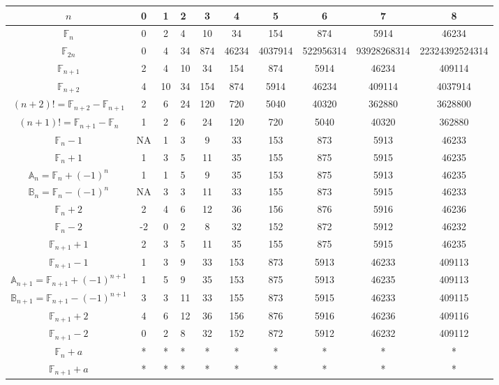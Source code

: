 \documentclass[pdflatex,sn-mathphys-num]{sn-jnl}%
\theoremstyle{thmstyleone}%
\theoremstyle{thmstyletwo}%
\theoremstyle{thmstylethree}%
\begin{document}
\begin{table}[!ht]\label{T}
    \centering
    \begin{tabular}{|c|c|c|a|c|c|c|c|c|c|}\hline 
        $n$& 0 & 1 & 2 & 3 &4  &5  & 6 & 7 &8 \\\hline 
         $\mathbb{F}_n$& 0 & 2 & 4 & 10 & 34 &154  & 874 & 5914 & 46234 \\\hline
          $\mathbb{F}_{2n}$& 0 & 4 & 34 & 874 & 46234 &4037914  & 522956314 & 93928268314 & 22324392524314 \\\hline   
        $\mathbb{F}_{n+1}$ & 2 & 4 & 10 & 34 & 154 & 874 & 5914 & 46234 &409114 \\\hline
         $\mathbb{F}_{n+2}$ & 4 & 10 & 34 & 154 & 874 & 5914 & 46234 & 409114 &4037914 \\\hline
          $(n+2)!=\mathbb{F}_{n+2}-\mathbb{F}_{n+1}$ & 2 & 6 & 24 & 120 & 720 & 5040 & 40320 & 362880 &3628800 \\\hline
           $(n+1)!=\mathbb{F}_{n+1}-\mathbb{F}_{n}$ & 1 & 2 & 6 & 24 & 120 & 720 & 5040 & 40320 &362880 \\\hline
         $\mathbb{F}_{n}-1$ & NA & 1 & 3 & 9 & 33 & 153 & 873 & 5913 &46233 \\\hline
         $\mathbb{F}_{n}+1$ &1  & 3 & 5 & 11 & 35 & 155 & 875 & 5915 &46235 \\\hline
         $\mathbb{A}_n=\mathbb{F}_{n}+(-1)^n$ & 1 & 1 & 5 & 9 & 35 & 153 & 875 & 5913 & 46235\\\hline
         $\mathbb{B}_n=\mathbb{F}_{n}-(-1)^n$ & NA & 3 & 3 & 11 & 33 & 155 & 873 & 5915 &46233 \\\hline
         $\mathbb{F}_{n}+2$ & 2 & 4 & 6 & 12 & 36 & 156 & 876 & 5916 &46236 \\\hline
        $\mathbb{F}_{n}-2$ & -2 & 0 & 2 & 8 & 32 & 152 & 872 & 5912 &46232 \\\hline
         $\mathbb{F}_{n+1}+1$ & 2 & 3 & 5 & 11 & 35 & 155 & 875 & 5915 & 46235 \\\hline
        $\mathbb{F}_{n+1}-1$ & 1 & 3 & 9 & 33 & 153 & 873 & 5913 & 46233 &409113 \\\hline
        $\mathbb{A}_{n+1}=\mathbb{F}_{n+1}+(-1)^{n+1}$ & 1 & 5 & 9 & 35 & 153 & 875 & 5913 & 46235 &409113 \\\hline
        $\mathbb{B}_{n+1}=\mathbb{F}_{n+1}-(-1)^{n+1}$ & 3 & 3 & 11 & 33 & 155 & 873 & 5915 & 46233 &409115 \\\hline
        $\mathbb{F}_{n+1}+2$ & 4 & 6 & 12 & 36 & 156 & 876 & 5916 & 46236 &409116 \\\hline
        $\mathbb{F}_{n+1}-2$ & 0 & 2 & 8 & 32 & 152 & 872 & 5912 & 46232 &409112 \\\hline{}
        $\mathbb{F}_{n}+a$ & * & * & * & * & * & * & * & * &* \\\hline  {}
        $\mathbb{F}_{n+1}+a$ & * & * & * & * & * & * & * & * & * \\\hline 


\end{tabular}
\end{table}
\end{document}
